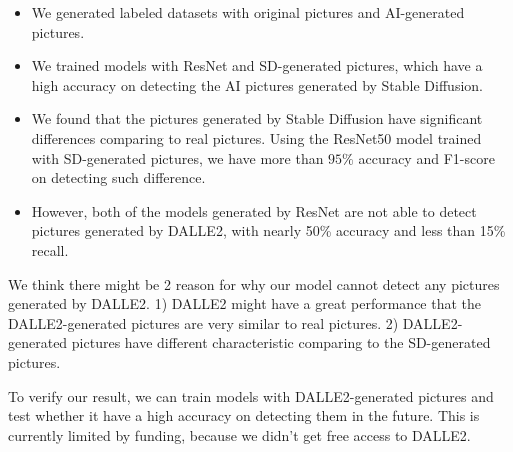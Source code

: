 \documentclass[11pt]{article}
\begin{document}
\begin{itemize}
    \item We generated labeled datasets with original pictures and AI-generated pictures.
    \item We trained models with ResNet and SD-generated pictures, which have a high accuracy on detecting the AI pictures generated by Stable Diffusion.
    \item We found that the pictures generated by Stable Diffusion have significant differences comparing to real pictures. Using the ResNet50 model trained with SD-generated pictures, we have more than $95\%$ accuracy and F1-score on detecting such difference.
    \item However, both of the models generated by ResNet are not able to detect pictures generated by DALLE2, with nearly 50\% accuracy and less than 15\% recall.
\end{itemize}

We think there might be 2 reason for why our model cannot detect any pictures generated by DALLE2. 1) DALLE2 might have a great performance that the DALLE2-generated pictures are very similar to real pictures. 2) DALLE2-generated pictures have different characteristic comparing to the SD-generated pictures.

To verify our result, we can train models with DALLE2-generated pictures and test whether it have a high accuracy on detecting them in the future. This is currently limited by funding, because we didn't get free access to DALLE2.



\end{document}
